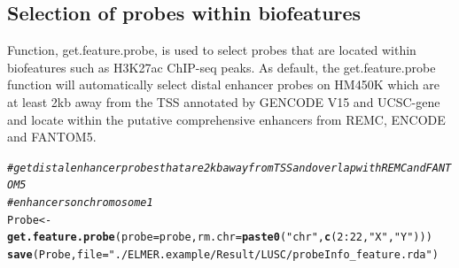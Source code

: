 \documentclass{article}\usepackage[]{graphicx}\usepackage[usenames,dvipsnames]{color}
\makeatletter
\newcommand{\hlnum}[1]{\textcolor[rgb]{0.686,0.059,0.569}{#1}}%
\newcommand{\hlstr}[1]{\textcolor[rgb]{0.192,0.494,0.8}{#1}}%
\newcommand{\hlcom}[1]{\textcolor[rgb]{0.678,0.584,0.686}{\textit{#1}}}%
\newcommand{\hlopt}[1]{\textcolor[rgb]{0,0,0}{#1}}%
\newcommand{\hlstd}[1]{\textcolor[rgb]{0.345,0.345,0.345}{#1}}%
\newcommand{\hlkwb}[1]{\textcolor[rgb]{0.69,0.353,0.396}{#1}}%
\newcommand{\hlkwc}[1]{\textcolor[rgb]{0.333,0.667,0.333}{#1}}%
\newcommand{\hlkwd}[1]{\textcolor[rgb]{0.737,0.353,0.396}{\textbf{#1}}}%
\newenvironment{kframe}{%
 \def\at@end@of@kframe{}%
 \ifinner\ifhmode%
  \def\at@end@of@kframe{\end{minipage}}%
  \begin{minipage}{\columnwidth}%
 \fi\fi%
 \def\FrameCommand##1{\hskip\@totalleftmargin \hskip-\fboxsep
 \colorbox{shadecolor}{##1}\hskip-\fboxsep
     \hskip-\linewidth \hskip-\@totalleftmargin \hskip\columnwidth}%
 \MakeFramed {\advance\hsize-\width
   \@totalleftmargin\z@ \linewidth\hsize
   \@setminipage}}%
 {\par\unskip\endMakeFramed%
 \at@end@of@kframe}
\newenvironment{knitrout}{}{} %
\makeatother
\begin{document}
\subsection{Selection of probes within biofeatures}
Function, get.feature.probe, is used to select probes that are located within 
biofeatures such as H3K27ac ChIP-seq peaks. As default, the get.feature.probe function
will automatically select distal enhancer probes on HM450K which are at least 
2kb away from the TSS annotated by GENCODE V15 and UCSC-gene and locate within 
the putative comprehensive enhancers from REMC, ENCODE and FANTOM5. 
\begin{knitrout}
\color{fgcolor}\begin{kframe}
\begin{alltt}
\hlcom{#get distal enhancer probes that are 2kb away from TSS and overlap with REMC and FANTOM5 }
\hlcom{#enhancers on chromosome 1}
\hlstd{Probe} \hlkwb{<-} \hlkwd{get.feature.probe}\hlstd{(}\hlkwc{probe}\hlstd{=probe,} \hlkwc{rm.chr}\hlstd{=}\hlkwd{paste0}\hlstd{(}\hlstr{"chr"}\hlstd{,}\hlkwd{c}\hlstd{(}\hlnum{2}\hlopt{:}\hlnum{22}\hlstd{,}\hlstr{"X"}\hlstd{,}\hlstr{"Y"}\hlstd{)))}
\hlkwd{save}\hlstd{(Probe,}\hlkwc{file}\hlstd{=}\hlstr{"./ELMER.example/Result/LUSC/probeInfo_feature.rda"}\hlstd{)}
\end{alltt}
\end{kframe}
\end{knitrout}
\end{document}
